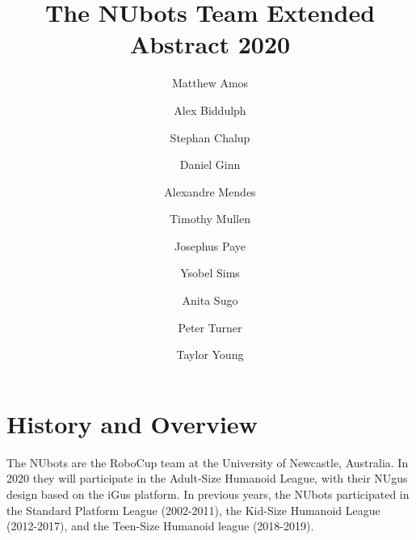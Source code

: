 \documentclass{llncs}
\begin{document}
%

\frontmatter          %
%
\pagestyle{headings}  %
%
%
\mainmatter              %
%
\title{The NUbots Team Extended Abstract 2020}
%

\author{Matthew Amos
        \and Alex Biddulph
        \and Stephan Chalup
        \and Daniel Ginn
		\and Alexandre Mendes
        \and Timothy Mullen
        \and Josephus Paye
        \and Ysobel Sims
        \and Anita Sugo
        \and Peter Turner
        \and Taylor Young
        }
       
%
%

%
%

\maketitle              %



\section{History and Overview}

The NUbots are the RoboCup team at the University of Newcastle, Australia. In 2020 they will participate in the Adult-Size Humanoid League, with their NUgus design based on the iGus platform\cite{Nimbro2018TDP}. In previous years, the NUbots participated in the Standard Platform League (2002-2011), the Kid-Size Humanoid League (2012-2017), and the Teen-Size Humanoid league (2018-2019).
\end{document}
